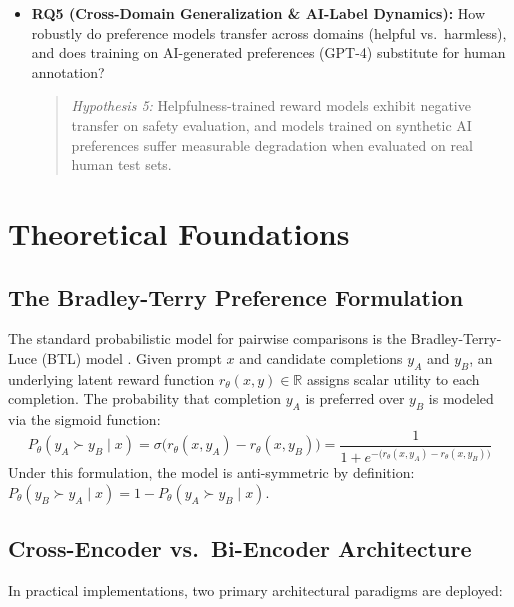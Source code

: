\documentclass[12pt,a4paper]{article}
\begin{document}
\begin{itemize}
    \item \textbf{RQ5 (Cross-Domain Generalization & AI-Label Dynamics):} How robustly do preference models transfer across domains (helpful vs.\ harmless), and does training on AI-generated preferences (GPT-4) substitute for human annotation?
    \begin{quote}
        \emph{Hypothesis 5:} Helpfulness-trained reward models exhibit negative transfer on safety evaluation, and models trained on synthetic AI preferences suffer measurable degradation when evaluated on real human test sets.
    \end{quote}
\end{itemize}

\section{Theoretical Foundations}

\subsection{The Bradley-Terry Preference Formulation}
The standard probabilistic model for pairwise comparisons is the Bradley-Terry-Luce (BTL) model \citep{bradley1952rank}. Given prompt $x$ and candidate completions $y_A$ and $y_B$, an underlying latent reward function $r_\theta(x, y) \in \mathbb{R}$ assigns scalar utility to each completion. The probability that completion $y_A$ is preferred over $y_B$ is modeled via the sigmoid function:
\begin{equation}
    P_\theta(y_A \succ y_B \mid x) = \sigma\big(r_\theta(x, y_A) - r_\theta(x, y_B)\big) = \frac{1}{1 + e^{-\big(r_\theta(x, y_A) - r_\theta(x, y_B)\big)}}
\end{equation}
Under this formulation, the model is anti-symmetric by definition: $P_\theta(y_B \succ y_A \mid x) = 1 - P_\theta(y_A \succ y_B \mid x)$.

\subsection{Cross-Encoder vs.\ Bi-Encoder Architecture}
In practical implementations, two primary architectural paradigms are deployed:
\end{document}
